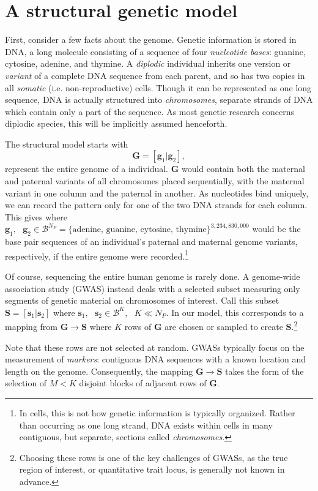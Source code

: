 \documentclass{article}
\newcommand{\ve}[1]{\mathbf{#1}}           %
\newcommand{\m}[1]{\mathbf{#1}}               %
\begin{document}
\section{A structural genetic model} \label{sec:theModel}

First, consider a few facts about the genome. Genetic information is stored in DNA, a long molecule consisting of a sequence of four \emph{nucleotide bases}: guanine, cytosine, adenine, and thymine. A \emph{diplodic} individual inherits one version or \emph{variant} of a complete DNA sequence from each parent, and so has two copies in all \emph{somatic} (i.e. non-reproductive) cells. Though it can be represented as one long sequence, DNA is actually structured into \emph{chromosomes}, separate strands of DNA which contain only a part of the sequence. As most genetic research concerns diplodic species, this will be implicitly assumed henceforth.


The structural model starts with $$\m{G} = [\ve{g}_1| \ve{g}_2],$$ represent the entire genome of a individual. $\m{G}$ would contain both the maternal and paternal variants of all chromosomes placed sequentially, with the maternal variant in one column and the paternal in another. As nucleotides bind uniquely, we can record the pattern only for one of the two DNA strands for each column. This gives where $\ve{g}_1,\text{ } \ve{g}_2 \in \mathcal{B}^{N_P} = \{\text{adenine, guanine, cytosine, thymine}\}^{3,234,830,000}$ would be the base pair sequences of an individual's paternal and maternal genome variants, respectively, if the entire genome were recorded.\footnote{In cells, this is not how genetic information is typically organized. Rather than occurring as one long strand, DNA exists within cells in many contiguous, but separate, sections called \textit{chromosomes}.}

Of course, sequencing the entire human genome is rarely done. A genome-wide association study (GWAS) instead deals with a selected subset measuring only segments of genetic material on chromosomes of interest. Call this subset $\m{S} = [\ve{s}_1 | \ve{s}_2]$ where $\ve{s}_1, \text{ } \ve{s}_2 \in \mathcal{B}^K, \text{ } K \ll N_P$. In our model, this corresponds to a mapping from $\m{G} \rightarrow \m{S}$ where $K$ rows of $\m{G}$ are chosen or sampled to create $\m{S}$.\footnote{Choosing these rows is one of the key challenges of GWASs, as the true region of interest, or quantitative trait locus, is generally not known in advance.}

Note that these rows are not selected at random. GWASs typically focus on the measurement of \textit{markers}: contiguous DNA sequences with a known location and length on the genome. Consequently, the mapping $\m{G} \rightarrow \m{S}$ takes the form of the selection of $M < K$ disjoint blocks of adjacent rows of $\m{G}$. 
\end{document}

